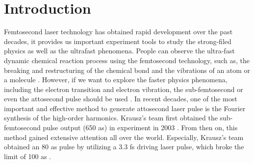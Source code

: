 \documentclass[10pt,letterpaper]{article}
\begin{document}
\section{Introduction}
Femtosecond laser technology has obtained rapid development over the past decades, it provides us important experiment tools to study the strong-filed physics as well as the ultrafast phenomena. People can observe the ultra-fast dynamic chemical reaction process using the femtosecond technology, such as, the breaking and restructuring of the chemical bond \cite{Mokhtari-chemical-bond-Nature-1990} and the vibrations of an atom or a molecule \cite{Ergler-Vibration-PRL-2006}. However, if we want to explore the faster physics phenomena, including the electron transition and electron vibration, the sub-femtosecond or even the attosecond pulse should be used \cite{Uiberacker-Attosecond-real-time-Nature-2007}. In recent decades, one of the most important and effective method to generate attosecond laser pulse is the Fourier synthesis of the high-order harmonics. Krausz's team first obtained the sub-femtosecond pulse output (650 as) in experiment in 2003 \cite{Krausz-Attosecon-Review-2009}. From then on, this method gained extensive attention all over the world. Especially, Krausz's team obtained an 80 as pulse by utilizing a 3.3 fs driving laser pulse, which broke the limit of 100 as \cite{Krausz-Attosecon-Review-2009}.
\end{document}
